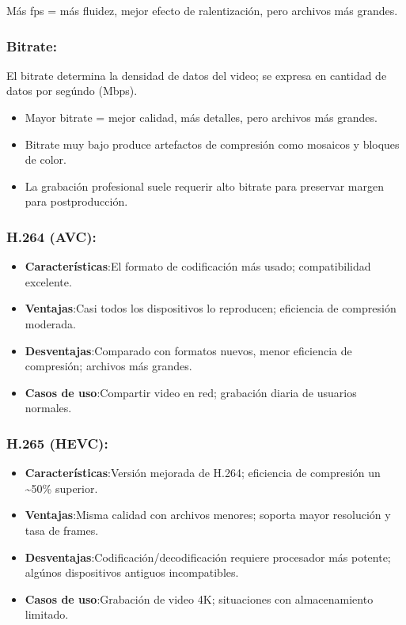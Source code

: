 Más fps = más fluidez, mejor efecto de ralentización, pero archivos más grandes.

\subsubsection*{Bitrate:}

El bitrate determina la densidad de datos del video; se expresa en cantidad de datos por segúndo (Mbps).

\begin{itemize}
  \item Mayor bitrate = mejor calidad, más detalles, pero archivos más grandes.
  \item Bitrate muy bajo produce artefactos de compresión como mosaicos y bloques de color.
  \item La grabación profesional suele requerir alto bitrate para preservar margen para postproducción.
\end{itemize}


\subsubsection*{H.264 (AVC):}

\begin{itemize}
  \item \textbf{Características}:El formato de codificación más usado; compatibilidad excelente.
  \item \textbf{Ventajas}:Casi todos los dispositivos lo reproducen; eficiencia de compresión moderada.
  \item \textbf{Desventajas}:Comparado con formatos nuevos, menor eficiencia de compresión; archivos más grandes.
  \item \textbf{Casos de uso}:Compartir video en red; grabación diaria de usuarios normales.
\end{itemize}

\subsubsection*{H.265 (HEVC):}

\begin{itemize}
  \item \textbf{Características}:Versión mejorada de H.264; eficiencia de compresión un \textasciitilde{}50\% superior.
  \item \textbf{Ventajas}:Misma calidad con archivos menores; soporta mayor resolución y tasa de frames.
  \item \textbf{Desventajas}:Codificación/decodificación requiere procesador más potente; algúnos dispositivos antiguos incompatibles.
  \item \textbf{Casos de uso}:Grabación de video 4K; situaciones con almacenamiento limitado.
\end{itemize}

